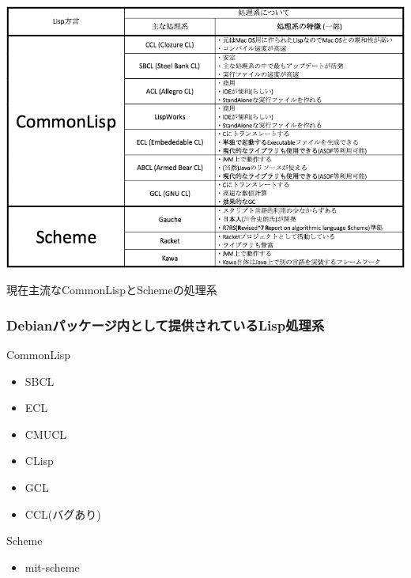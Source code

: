 \documentclass[mingoth,a4paper]{jsarticle}
\begin{document}
\begin{table}[htbp!]
\centering
\includegraphics[scale=0.5]{image201709-kansai/cl-scm_gray.png}
\caption{現在主流なCommonLispとSchemeの処理系}\label{table:cl_scm}
\end{table}

\pagebreak

\subsubsection{Debianパッケージ内として提供されているLisp処理系}

CommonLisp
\begin{itemize}
\item SBCL
\item ECL
\item CMUCL
\item CLisp
\item GCL
\item CCL(バグあり)
\end{itemize}

Scheme
\begin{itemize}
\item mit-scheme
\end{itemize}
\end{document}
